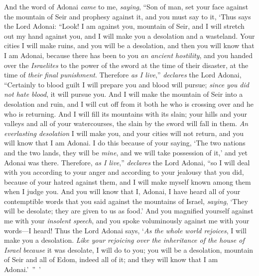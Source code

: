 \begin{biblechapter} %
 And the word of Adonai \textit{came} to me, \textit{saying},
\verse “Son of man, set your face against the mountain of Seir and prophesy against it,
\verse and you must say to it, ‘Thus says the Lord Adonai: “Look! I am against you, mountain of Seir, and I will stretch out my hand against you, and I will make you a desolation and a wasteland.
\verse Your cities I will make ruins, and you will be a desolation, and then you will know that I am Adonai,
\verse because there has been to you \textit{an ancient hostility}, and you handed over the \textit{Israelites} to the power of the sword at the time of their disaster, at the time of \textit{their final punishment}.
\verse Therefore \textit{as I live},” \textit{declares} the Lord Adonai, “Certainly to blood guilt I will prepare you and blood will pursue; \textit{since} \textit{you did not hate blood}, it will pursue you.
\verse And I will make the mountain of Seir into a desolation and ruin, and I will cut off from it both he who is crossing over and he who is returning.
\verse And I will fill its mountains with its slain; your hills and your valleys and all of your watercourses, the slain by the sword will fall in them.
\verse \textit{An everlasting desolation} I will make you, and your cities will not return, and you will know that I am Adonai.
\verse I do this because of your saying, ‘The two nations and the two lands, they will be \textit{mine}, and we will take possession of it,’ and yet Adonai was there.
\verse Therefore, \textit{as I live},” \textit{declares} the Lord Adonai, “so I will deal with you according to your anger and according to your jealousy that you did, because of your hatred against them, and I will make myself known among them when I judge you.
\verse And you will know that I, Adonai, I have heard all of your contemptible words that you said against the mountains of Israel, \textit{saying}, ‘They will be desolate; they are given to us as food.’
\verse And you magnified yourself against me with your \textit{insolent speech}, and you spoke voluminously against me with your words—I heard!
\verse Thus the Lord Adonai says, ‘\textit{As the whole world rejoices}, I will make you a desolation.
\verse \textit{Like your rejoicing over the inheritance of the house of Israel} \textit{because} it was desolate, I will do to you; you will be a desolation, mountain of Seir and all of Edom, indeed all of it; and they will know that I am Adonai.’ ” ’
\end{biblechapter}

